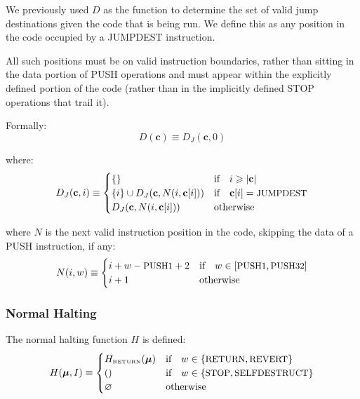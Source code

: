 \documentclass[9pt,oneside]{amsart}
\begin{document}
\begin{multicols}{2}
We previously used $D$ as the function to determine the set of valid jump destinations given the code that is being run. We define this as any position in the code occupied by a {\small JUMPDEST} instruction.

All such positions must be on valid instruction boundaries, rather than sitting in the data portion of {\small PUSH} operations and must appear within the explicitly defined portion of the code (rather than in the implicitly defined {\small STOP} operations that trail it).

Formally:
\begin{equation}
D(\mathbf{c}) \equiv D_J(\mathbf{c}, 0)
\end{equation}

where:
\begin{equation}
D_J(\mathbf{c}, i) \equiv \begin{cases}
\{\} & \text{if} \quad i \geqslant |\mathbf{c}|  \\
\{ i \} \cup D_J(\mathbf{c}, N(i, \mathbf{c}[i])) & \text{if} \quad \mathbf{c}[i] = \text{\small JUMPDEST} \\
D_J(\mathbf{c}, N(i, \mathbf{c}[i])) & \text{otherwise} \\
\end{cases}
\end{equation}

where $N$ is the next valid instruction position in the code, skipping the data of a {\small PUSH} instruction, if any:
\begin{equation}
N(i, w) \equiv \begin{cases}
i + w - \text{\small PUSH1} + 2 & \text{if} \quad w \in [\text{\small PUSH1}, \text{\small PUSH32}] \\
i + 1 & \text{otherwise} \end{cases}
\end{equation}

\subsubsection{Normal Halting}

The normal halting function $H$ is defined:
\begin{equation}
H(\boldsymbol{\mu}, I) \equiv \begin{cases}
H_{\text{\tiny RETURN}}(\boldsymbol{\mu}) & \text{if} \quad w \in \{\text{\small RETURN}, \text{\small REVERT}\} \\
() & \text{if} \quad w \in \{ \text{\small STOP}, \text{\small SELFDESTRUCT} \} \\
\varnothing & \text{otherwise}
\end{cases}
\end{equation}


\end{multicols}
\end{document}
